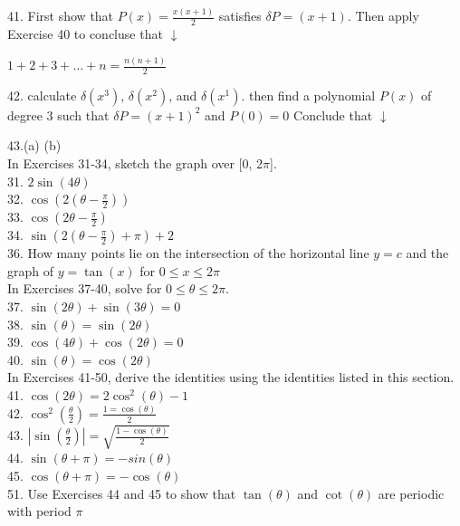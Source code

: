 \documentclass{article}
\begin{document}
41. First show that $P(x) = \frac{x(x+1)}{2}$ satisfies $\delta P = (x + 1)$. Then apply Exercise 40 to concluse that $\downarrow$

	\begin{center} $1 + 2 + 3 + \dots + n = \frac{n(n+1)}{2}$ \end{center}

42. calculate $\delta(x^3)$, $\delta(x^2)$, and $\delta(x^1)$. then find a polynomial $P(x)$ of degree 3 such that $\delta P = (x+1)^2$ and $P(0) = 0$ Conclude that $\downarrow$

43.(a) (b)\\

In Exercises 31-34, sketch the graph over [0, 2$\pi$].\\
31. $2\sin(4\theta)$\\
32. $\cos(2(\theta - \frac{\pi}{2}))$\\
33. $\cos(2\theta - \frac{\pi}{2})$\\
34. $\sin(2(\theta - \frac{\pi}{2}) + \pi) + 2$\\

36. How many points lie on the intersection of the horizontal line $y = c$ and the graph of $y = \tan(x)$ for $0 \leq x \leq 2\pi$\\

In Exercises 37-40, solve for $0 \leq \theta \leq 2\pi$.\\
37. $\sin(2\theta) + \sin(3\theta) = 0$\\
38. $\sin(\theta) = \sin(2\theta)$\\
39. $\cos(4\theta) + \cos(2\theta) = 0$\\
40. $\sin(\theta) = \cos(2\theta)$\\

In Exercises 41-50, derive the identities using the identities listed in this section.\\

41. $\cos(2\theta) = 2\cos^2(\theta) - 1$\\
42. $\cos^2(\frac{\theta}{2}) = \frac{1 = \cos(\theta)}{2}$\\
43. $\left|\sin(\frac{\theta}{2})\right| = \sqrt{\frac{1 - \cos(\theta)}{2}}$\\
44. $\sin(\theta + \pi) = -sin(\theta)$\\
45. $\cos(\theta + \pi) = -\cos(\theta)$\\
51. Use Exercises 44 and 45 to show that $\tan(\theta)$ and $\cot(\theta)$ are periodic with period $\pi$\\
\end{document}
